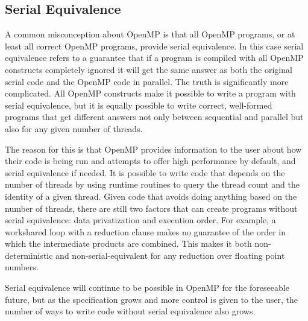 \subsection{Serial Equivalence}
\label{sub:serial_equivalence}

A common misconception about OpenMP is that all OpenMP programs, or at least all
correct OpenMP programs, provide serial equivalence. In this case serial
equivalence refers to a guarantee that if a program is compiled with all OpenMP
constructs completely ignored it will get the same answer as both the original
serial code and the OpenMP code in parallel.  The truth is significantly more
complicated.  All OpenMP constructs make it possible to write a program with
serial equivalence, but it is equally possible to write correct, well-formed
programs that get different answers not only between sequential and parallel but
also for any given number of threads.

The reason for this is that OpenMP provides information to the user about how
their code is being run and attempts to offer high performance by default, and
serial equivalence if needed.  It is possible to write code that depends on the
number of threads by using runtime routines to query the thread count and the
identity of a given thread.  Given code that avoids doing anything based on the
number of threads, there are still two factors that can create programs without
serial equivalence: data privatization and execution order.  For example, a
workshared loop with a reduction clause makes no guarantee of the order in which
the intermediate products are combined.  This makes it both non-deterministic
and non-serial-equivalent for any reduction over floating point numbers.

Serial equivalence will continue to be possible in OpenMP for the foreseeable
future, but as the specification grows and more control is given to the user,
the number of ways to write code without serial equivalence also grows.

